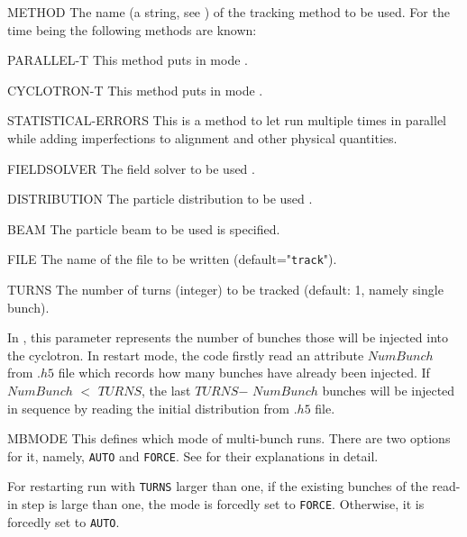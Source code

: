 \begin{kdescription}
\item[METHOD]
  The name (a string, see ) of the tracking method to be used.
  For the time being the following methods are known:
  \begin{kdescription}
    \item[PARALLEL-T]
    This method puts \opal in \opalt mode .
    \item[CYCLOTRON-T]
    This method puts \opal in \opalcycl mode .
    \item[STATISTICAL-ERRORS]
    This is a method to let \opal run multiple times in parallel while adding imperfections to alignment and other physical quantities.
  \end{kdescription}
  \item[FIELDSOLVER]
  The field solver to be used .

  \item[DISTRIBUTION]
  The particle distribution to be used .

  \item[BEAM]
  The particle beam  to be used is specified.

  \item[FILE]
  The name of the file to be written (default="\texttt{track}").
  \item[TURNS]
  The number of turns (integer) to be tracked (default: 1, namely single bunch).

  In \opalcycl, this parameter represents the number of bunches those will be injected into the cyclotron. In restart mode, the code
  firstly read an attribute $NumBunch$ from $.h5$ file which records how many bunches have already been injected. If $NumBunch$
  $<$ $TURNS$, the last $TURNS$$ -$ $NumBunch$ bunches will be injected in sequence by reading the initial distribution from $.h5$ file.

  \item[MBMODE]
  This defines which mode of multi-bunch runs. There are two options for it, namely, \texttt{AUTO} and \texttt{FORCE}.
  See  for their explanations in detail.

  For restarting run with \texttt{TURNS} larger than one, if the existing bunches of the read-in step is large than one,
  the mode is forcedly set to \texttt{FORCE}. Otherwise, it is forcedly set to \texttt{AUTO}.


\end{kdescription}
